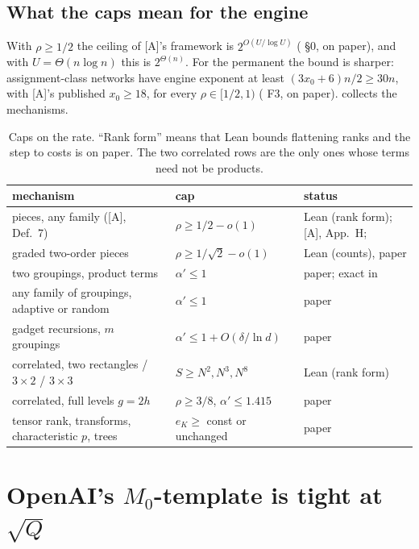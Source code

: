 \documentclass[10pt]{amsart}
\theoremstyle{plain}
\theoremstyle{definition}
\theoremstyle{remark}
\numberwithin{equation}{section}
\newcommand{\A}{\textup{[A]}}
\begin{document}
\subsection{What the caps mean for the engine}\label{sec:meaning}
With $\rho\ge1/2$ the ceiling of \A's framework is $2^{O(U/\log U)}$ ( \S0, on paper),
and with $U=\Theta(n\log n)$ this is $2^{\Theta(n)}$. For the permanent the bound is sharper:
assignment-class networks have engine exponent at least $(3x_0+6)n/2\ge30n$, with \A's published
$x_0\ge18$, for every $\rho\in[1/2,1)$ ( F3, on paper).  collects the mechanisms.

\begin{table}[ht]
\centering\small
\begin{tabular}{@{}>{\raggedright}p{}>{\raggedright}p{}>{\raggedright\arraybackslash}p{}@{}}
\toprule
mechanism & cap & status\\
\midrule
pieces, any family (\A, Def.~7) & $\rho\ge1/2-o(1)$ & Lean (rank form); \A, App.~H; \cite{Maj26}\\
graded two-order pieces & $\rho\ge1/\sqrt2-o(1)$ & Lean (counts), paper\\
two groupings, product terms & $\alpha'\le1$ & paper; exact in \cite[Thm.~4.13]{Maj26}\\
any family of groupings, adaptive or random & $\alpha'\le1$ & paper\\
gadget recursions, $m$ groupings & $\alpha'\le1+O(\delta/\ln d)$ & paper\\
correlated, two rectangles / $3\times2$ / $3\times3$ & $S\ge N^2,N^3,N^8$ & Lean (rank form)\\
correlated, full levels $g=2h$ & $\rho\ge3/8$, $\alpha'\le1.415$ & paper\\
tensor rank, transforms, characteristic $p$, trees & $e_K\ge$ const or unchanged & paper\\
\bottomrule
\end{tabular}
\caption{Caps on the rate. ``Rank form'' means that Lean bounds flattening ranks and the step to costs is
on paper. The two correlated rows are the only ones whose terms need not be products.}\label{tab:caps}
\end{table}

\section{OpenAI's \texorpdfstring{$M_0$}{M0}-template is tight at \texorpdfstring{$\sqrt Q$}{sqrt Q}}\label{sec:openai}
\end{document}

